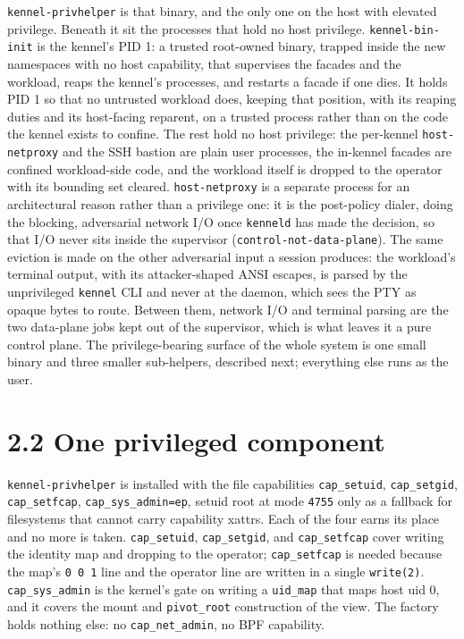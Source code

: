 \texttt{kennel-privhelper} is that binary, and the only one on the host
with elevated privilege. Beneath it sit the processes that hold no host
privilege. \texttt{kennel-bin-init} is the kennel's PID 1: a trusted
root-owned binary, trapped inside the new namespaces with no host
capability, that supervises the facades and the workload, reaps the
kennel's processes, and restarts a facade if one dies. It holds PID 1 so
that no untrusted workload does, keeping that position, with its reaping
duties and its host-facing reparent, on a trusted process rather than on
the code the kennel exists to confine. The rest hold no host privilege:
the per-kennel \texttt{host-netproxy} and the SSH bastion are plain user
processes, the in-kennel facades are confined workload-side code, and
the workload itself is dropped to the operator with its bounding set
cleared. \texttt{host-netproxy} is a separate process for an
architectural reason rather than a privilege one: it is the post-policy
dialer, doing the blocking, adversarial network I/O once
\texttt{kenneld} has made the decision, so that I/O never sits inside
the supervisor (\texttt{control-not-data-plane}). The same eviction is
made on the other adversarial input a session produces: the workload's
terminal output, with its attacker-shaped ANSI escapes, is parsed by the
unprivileged \texttt{kennel} CLI and never at the daemon, which sees the
PTY as opaque bytes to route. Between them, network I/O and terminal
parsing are the two data-plane jobs kept out of the supervisor, which is
what leaves it a pure control plane. The privilege-bearing surface of
the whole system is one small binary and three smaller sub-helpers,
described next; everything else runs as the user.

\hypertarget{one-privileged-component}{%
\section{2.2 One privileged component}\label{one-privileged-component}}

\texttt{kennel-privhelper} is installed with the file capabilities
\texttt{cap\_setuid}, \texttt{cap\_setgid}, \texttt{cap\_setfcap},
\texttt{cap\_sys\_admin=ep}, setuid root at mode \texttt{4755} only as a
fallback for filesystems that cannot carry capability xattrs. Each of
the four earns its place and no more is taken. \texttt{cap\_setuid},
\texttt{cap\_setgid}, and \texttt{cap\_setfcap} cover writing the
identity map and dropping to the operator; \texttt{cap\_setfcap} is
needed because the map's \texttt{0\ 0\ 1} line and the operator line are
written in a single \texttt{write(2)}. \texttt{cap\_sys\_admin} is the
kernel's gate on writing a \texttt{uid\_map} that maps host uid 0, and
it covers the mount and \texttt{pivot\_root} construction of the view.
The factory holds nothing else: no \texttt{cap\_net\_admin}, no BPF
capability.

